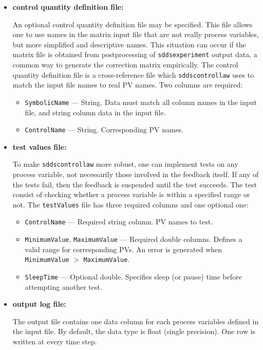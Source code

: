 \begin{itemize}
\begin{itemize}
\item {\bf control quantity definition file:} \par An optional control
quantity definition file may be specified. This file allows one to use
names in the matrix input file that are not really process variables,
but more simplified and descriptive names.  This situation can occur
if the matrix file is obtained from postprocessing of
\verb+sddsexperiment+ output data, a common way to generate
the correction matrix empirically.  The control quantity definition
file is a cross-reference file which \verb+sddscontrollaw+ uses to
match the input file names to real PV names.  Two columns are
required:
\begin{itemize}
        \item {\tt SymbolicName} --- String. Data must match all column
                names in the input file, and string column data in the input file.
        \item {\tt ControlName} --- String. Corresponding PV names.
\end{itemize}

\item {\bf test values file:} \par
To make \verb+sddscontrollaw+ more robust, one can implement tests on any process variable,
not necessarily those involved in the feedback itself. If any of the tests fail, then the 
feedback is suspended until the test succeeds. The test consist of checking whether a process 
variable is within a specified range or not. The \verb+testValues+ file has three required columns and
one optional one:
\begin{itemize}
        \item {\tt ControlName} --- Required string column. PV names to test.
        \item {\tt MinimumValue}, {\tt MaximumValue} --- Required double columns. Defines
                a valid range for corresponding PVs. An error is generated when
                {\tt MinimumValue} $>$ {\tt MaximumValue}.
        \item {\tt SleepTime} --- Optional double. Specifies sleep (or pause) time before
                attempting another test.
\end{itemize}

\item {\bf output log file:} \par
The output file contains one data column for each process variables defined in the input file.
By default, the data type is float (single precision). One row is written at every time step.


\end{itemize}
\end{itemize}
